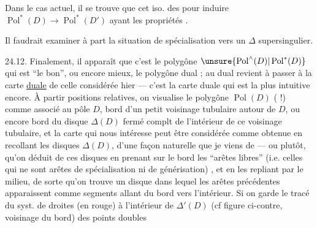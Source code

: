
Dans le cas actuel, il se trouve que cet iso. des    pour induire  $\operatorname{Pol}^*(D)\longrightarrow\operatorname{Pol}^*(D')$ ayant les propriétés .

Il faudrait examiner à part la situation de spécialisation vers un $\Delta$ supersingulier.

24.12. Finalement, il apparaît que c'est le polygône $\unsure{\operatorname{Pol}^{\wedge}(D)|\operatorname{Pol}^{*}(D)}$ qui est ``le bon'', ou encore mieux, le polygône dual ;   au dual revient à passer à la carte \uline{duale} de celle considérée hier --- c'est la carte duale qui est la plus intuitive encore. À partir  positions relatives, on visualise le polygône  $\operatorname{Pol}(D)$ (  !) comme  associé au pôle $D$, bord d'un petit voisinage tubulaire autour de $D$, ou encore bord du disque $\Delta(D)$ fermé complt de l'intérieur de ce voisinage tubulaire, et la carte qui nous intéresse peut être considérée comme obtenue en recollant les disques $\Delta(D)$, d'une façon naturelle que je viens de  --- ou plutôt,  qu'on déduit de ces disques en prenant  sur le bord les ``arêtes libres'' (i.e. celles qui ne sont arêtes de spécialisation ni de générisation) , et en les repliant par le milieu, de sorte qu'on trouve un disque  dans lequel les arêtes  précédentes apparaissent comme  segments allant du bord vers l'intérieur. Si on garde le tracé du  syst. de droites (en rouge) à l'intérieur de $\Delta'(D)$ (cf figure ci-contre, voisinage du bord)  des points doubles

